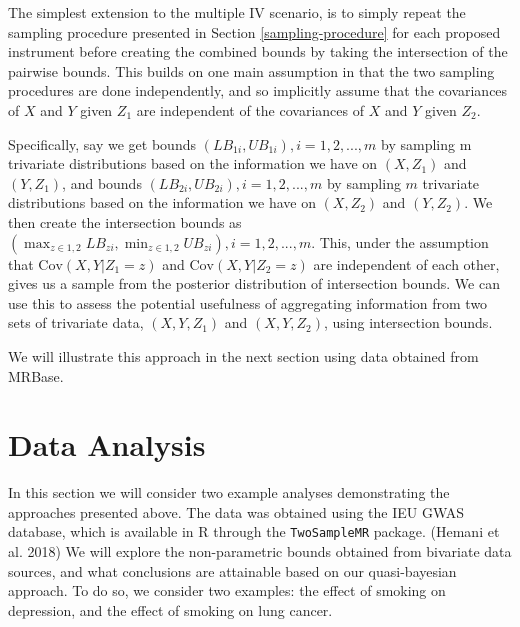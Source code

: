 \documentclass[
]{article}
\theoremstyle{plain}
\begin{document}
The simplest extension to the multiple IV scenario, is to simply repeat the sampling procedure presented in Section \ref{sampling-procedure} for each proposed instrument before creating the combined bounds by taking the intersection of the pairwise bounds. This builds on one main assumption in that the two sampling procedures are done independently, and so implicitly assume that the covariances of \(X\) and \(Y\) given \(Z_1\) are independent of the covariances of \(X\) and \(Y\) given \(Z_2\).

Specifically, say we get bounds \((LB_{1i},UB_{1i}),i = 1,2,...,m\) by sampling m trivariate distributions based on the information we have on \((X,Z_1)\) and \((Y,Z_1)\), and bounds \((LB_{2i}, UB_{2i}),i = 1,2,...,m\) by sampling \(m\) trivariate distributions based on the information we have on \((X,Z_2)\) and \((Y,Z_2)\). We then create the intersection bounds as \(\left(\max_{z \in {1,2}} LB_{zi}, \min_{z \in {1,2}} UB_{zi}\right), i = 1, 2, ..., m\). This, under the assumption that \(\text{Cov}(X, Y | Z_1 = z)\) and \(\text{Cov}(X, Y | Z_2 = z)\) are independent of each other, gives us a sample from the posterior distribution of intersection bounds. We can use this to assess the potential usefulness of aggregating information from two sets of trivariate data, \((X, Y, Z_1)\) and \((X, Y, Z_2)\), using intersection bounds.

We will illustrate this approach in the next section using data obtained from MRBase.

\hypertarget{data-analysis}{%
\section{Data Analysis}\label{data-analysis}}

In this section we will consider two example analyses demonstrating the approaches presented above. The data was obtained using the IEU GWAS database, which is available in R through the \texttt{TwoSampleMR} package. (Hemani et al. 2018) We will explore the non-parametric bounds obtained from bivariate data sources, and what conclusions are attainable based on our quasi-bayesian approach. To do so, we consider two examples: the effect of smoking on depression, and the effect of smoking on lung cancer.
\end{document}
